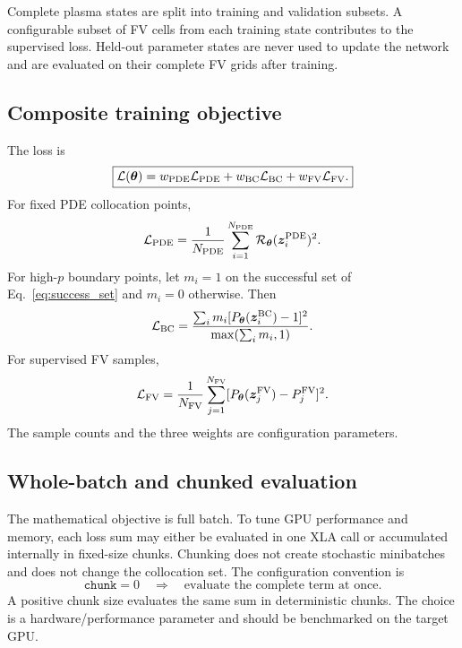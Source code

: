 \documentclass[11pt]{article}
\newcommand{\thetaNN}{\bm\theta}
\begin{document}
Complete plasma states are split into training and validation subsets.  A configurable
subset of FV cells from each training state contributes to the supervised loss.  Held-out
parameter states are never used to update the network and are evaluated on their complete
FV grids after training.

\subsection{Composite training objective}

The loss is
\begin{equation}
 \boxed{
 \mathcal L(\thetaNN)
 =w_{\rm PDE}\mathcal L_{\rm PDE}
 +w_{\rm BC}\mathcal L_{\rm BC}
 +w_{\rm FV}\mathcal L_{\rm FV}.
 }
 \label{eq:total_loss}
\end{equation}
For fixed PDE collocation points,
\begin{equation}
 \mathcal L_{\rm PDE}
 =\frac{1}{N_{\rm PDE}}
  \sum_{i=1}^{N_{\rm PDE}}
  \mathcal R_{\thetaNN}(\bm z_i^{\rm PDE})^2.
\end{equation}
For high-$p$ boundary points, let $m_i=1$ on the successful set of
Eq.~\eqref{eq:success_set} and $m_i=0$ otherwise.  Then
\begin{equation}
 \mathcal L_{\rm BC}
 =\frac{\sum_i m_i[P_{\thetaNN}(\bm z_i^{\rm BC})-1]^2}
        {\max(\sum_i m_i,1)}.
\end{equation}
For supervised FV samples,
\begin{equation}
 \mathcal L_{\rm FV}
 =\frac{1}{N_{\rm FV}}
  \sum_{j=1}^{N_{\rm FV}}
  [P_{\thetaNN}(\bm z_j^{\rm FV})-P_j^{\rm FV}]^2.
\end{equation}
The sample counts and the three weights are configuration parameters.

\subsection{Whole-batch and chunked evaluation}

The mathematical objective is full batch.  To tune GPU performance and memory, each loss
sum may either be evaluated in one XLA call or accumulated internally in fixed-size chunks.
Chunking does not create stochastic minibatches and does not change the collocation set.
The configuration convention is
\begin{equation}
 \texttt{chunk}=0\quad\Longrightarrow\quad\text{evaluate the complete term at once}.
\end{equation}
A positive chunk size evaluates the same sum in deterministic chunks.  The choice is a
hardware/performance parameter and should be benchmarked on the target GPU.
\end{document}
